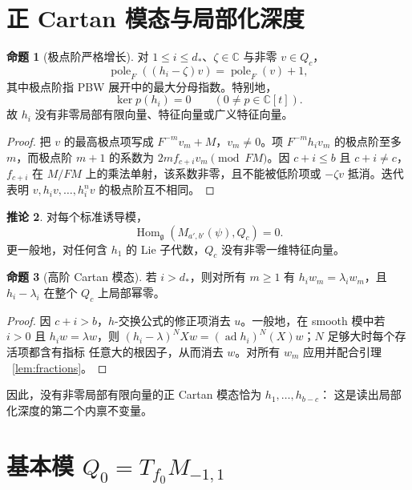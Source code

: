 \documentclass[UTF8,11pt]{ctexart}
\newcommand{\C}{\mathbb C}
\newcommand{\g}{\mathfrak g}
\newcommand{\ad}{\operatorname{ad}}
\newcommand{\Hom}{\operatorname{Hom}}
\newcommand{\pole}{\operatorname{pole}}
\theoremstyle{definition}
\newtheorem{proposition}{命题}[section]
\newtheorem{corollary}[proposition]{推论}
\begin{document}
\section{正 Cartan 模态与局部化深度}\label{sec:cartan}

\begin{proposition}[极点阶严格增长]\label{prop:pole}
对 \(1\le i\le d_*\)、\(\zeta\in\C\) 与非零 \(v\in Q_c\)，
\[
\pole_F((h_i-\zeta)v)=\pole_F(v)+1,
\]
其中极点阶指 PBW 展开中的最大分母指数。特别地，
\[
\ker p(h_i)=0\qquad(0\ne p\in\C[t]).
\]
故 \(h_i\) 没有非零局部有限向量、特征向量或广义特征向量。
\end{proposition}

\begin{proof}
把 \(v\) 的最高极点项写成 \(F^{-m}v_m+M\)，\(v_m\ne0\)。项
\(F^{-m}h_iv_m\) 的极点阶至多 \(m\)，而极点阶 \(m+1\) 的系数为
\(2mf_{c+i}v_m\pmod{FM}\)。因 \(c+i\le b\) 且 \(c+i\ne c\)，
\(f_{c+i}\) 在 \(M/FM\) 上的乘法单射，该系数非零，且不能被低阶项或
\(-\zeta v\) 抵消。迭代表明 \(v,h_iv,\ldots,h_i^nv\) 的极点阶互不相同。
\end{proof}

\begin{corollary}\label{cor:no-whittaker}
对每个标准诱导模，
\[
\Hom_\g(M_{a',b'}(\psi),Q_c)=0.
\]
更一般地，对任何含 \(h_1\) 的 Lie 子代数，\(Q_c\) 没有非零一维特征向量。
\end{corollary}

\begin{proposition}[高阶 Cartan 模态]\label{prop:high}
若 \(i>d_*\)，则对所有 \(m\ge1\) 有 \(h_iw_m=\lambda_iw_m\)，且
\(h_i-\lambda_i\) 在整个 \(Q_c\) 上局部幂零。
\end{proposition}

\begin{proof}
因 \(c+i>b\)，\(h\)-交换公式的修正项消去 \(u\)。一般地，在 smooth 模中若
\(i>0\) 且 \(h_iw=\lambda w\)，则
\((h_i-\lambda)^NXw=(\ad h_i)^N(X)w\)；\(N\) 足够大时每个存活项都含有指标
任意大的根因子，从而消去 \(w\)。对所有 \(w_m\) 应用并配合引理
~\ref{lem:fractions}。
\end{proof}

因此，没有非零局部有限向量的正 Cartan 模态恰为 \(h_1,\ldots,h_{b-c}\)：
这是读出局部化深度的第二个内禀不变量。

\section{基本模 \texorpdfstring{\(Q_0=T_{f_0}M_{-1,1}\)}{Q0}}\label{sec:basic}
\end{document}
